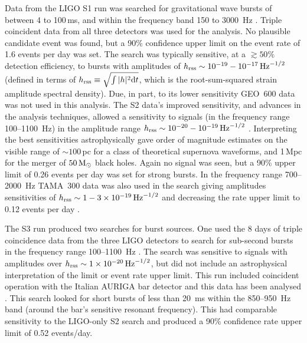 \documentclass{article}
\begin{document}
Data from the LIGO S1 run was searched for gravitational wave bursts of between
4 to 100\,ms, and within the frequency band 150 to 3000~Hz \cite{Abbott:2004b}.
Triple coincident data from all three detectors was used for the analysis. No
plausible candidate event was found, but a 90\% confidence upper limit on the
event rate of 1.6 events per day was set. The search was typically sensitive, at
a $\gtrsim50\%$ detection efficiency, to bursts with amplitudes of $h_{\rm
rss}\sim10^{-19}-10^{-17}\,{\rm Hz}^{-1/2}$ (defined in terms of $h_{\rm
rss} \equiv \sqrt{\int|h|^2{\rm d}t}$, which is the root-sum-squared strain
amplitude spectral density). Due, in part, to its lower sensitivity GEO~600 data
was not used in this analysis. The S2 data's improved sensitivity, and advances
in the analysis techniques, allowed a sensitivity to signals (in the frequency
range 100--1100~Hz) in the amplitude range $h_{\rm
rss}\sim10^{-20}-10^{-19}\,{\rm Hz}^{-1/2}$ \cite{Abbott:2005a}. Interpreting
the best sensitivities astrophysically gave order of magnitude estimates on the
visible range of $\sim100$\,pc for a class of theoretical supernova waveforms,
and 1\,Mpc for the merger of $50\,{\rm M}_{\odot}$ black holes. Again no signal
was seen, but a 90\% upper limit of 0.26 events per day was set for strong
bursts. In the frequency range 700--2000~Hz TAMA~300 data was also used in the
search giving amplitudes sensitivities of $h_{\rm
rss}\sim1-3\times10^{-19}\,{\rm Hz}^{-1/2}$ and decreasing the rate upper limit
to 0.12 events per day \cite{Abbott:2005c}.

The S3 run produced two searches for burst sources. One used the 8 days of
triple coincidence data from the three LIGO detectors to search for sub-second
bursts in the frequency range 100--1100~Hz \cite{Abbott:2006a}. The search was
sensitive to signals with amplitudes over $h_{\rm rss}\sim1\times10^{-20}\,{\rm
Hz}^{-1/2}$, but did not include an astrophysical interpretation of the limit or
event rate upper limit. This run included coincident operation with the Italian
AURIGA bar detector and this data has been analysed \cite{Baggio:2008}. This
search looked for short bursts of less than 20~ms within the 850--950~Hz band
(around the bar's sensitive resonant frequency). This had comparable sensitivity
to the LIGO-only S2 search and produced a 90\% confidence rate upper limit of
0.52 events/day.
\end{document}

